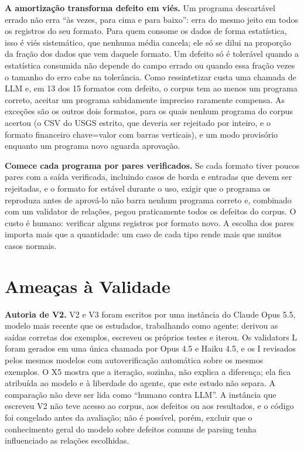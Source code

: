\documentclass[sigconf,nonacm]{acmart}
\begin{document}
\textbf{A amortização transforma defeito em viés.} Um programa descartável errado não erra ``às vezes, para cima e para baixo'': erra do mesmo jeito em todos os registros do seu formato. Para quem consome os dados de forma estatística, isso é viés sistemático, que nenhuma média cancela; ele só se dilui na proporção da fração dos dados que vem daquele formato. Um defeito só é tolerável quando a estatística consumida não depende do campo errado ou quando essa fração vezes o tamanho do erro cabe na tolerância. Como ressintetizar custa uma chamada de LLM e, em 13 dos 15 formatos com defeito, o corpus tem ao menos um programa correto, aceitar um programa sabidamente impreciso raramente compensa. As exceções são os outros dois formatos, para os quais nenhum programa do corpus acertou (o CSV do USGS estrito, que deveria ser rejeitado por inteiro, e o formato financeiro chave=valor com barras verticais), e um modo provisório enquanto um programa novo aguarda aprovação.

\textbf{Comece cada programa por pares verificados.} Se cada formato tiver poucos pares com a saída verificada, incluindo casos de borda e entradas que devem ser rejeitadas, e o formato for estável durante o uso, exigir que o programa os reproduza antes de aprová-lo não barra nenhum programa correto e, combinado com um validator de relações, pegou praticamente todos os defeitos do corpus. O custo é humano: verificar alguns registros por formato novo. A escolha dos pares importa mais que a quantidade: um caso de cada tipo rende mais que muitos casos normais.

\section{Ameaças à Validade}
\label{sec:ameacas}

\textbf{Autoria de V2.} V2 e V3 foram escritos por uma instância do Claude Opus 5.5, modelo mais recente que os estudados, trabalhando como agente: derivou as saídas corretas dos exemplos, escreveu os próprios testes e iterou. Os validators L foram gerados em uma única chamada por Opus 4.5 e Haiku 4.5, e os I revisados pelos mesmos modelos com autoverificação automática sobre os mesmos exemplos. O X5 mostra que a iteração, sozinha, não explica a diferença; ela fica atribuída ao modelo e à liberdade do agente, que este estudo não separa. A comparação não deve ser lida como ``humano contra LLM''. A instância que escreveu V2 não teve acesso ao corpus, aos defeitos ou aos resultados, e o código foi congelado antes da avaliação; não é possível, porém, excluir que o conhecimento geral do modelo sobre defeitos comuns de parsing tenha influenciado as relações escolhidas.
\end{document}
